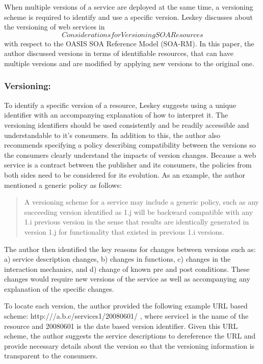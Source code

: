 \documentclass[runningheads,a4paper]{llncs}
\begin{document}
When multiple versions of a service are deployed at the same time, a versioning scheme is required to identify and use a specific version. Leskey discusses about the versioning of web services in \[Considerations for Versioning SOA Resources\] with respect to the OASIS SOA Reference Model (SOA-RM). In this paper, the author discussed versions in terms of identifiable resources, that can have multiple versions and are modified by applying new versions to the original one.

\subsubsection{Versioning:}
To identify a specific version of a resource, Leskey suggests using a unique identifier with an accompanying explanation of how to interpret it. The versioning identifiers should be used consistently and be readily accessible and understandable to it’s consumers. In addition to this, the author also recommends specifying a policy describing compatibility between the versions so the consumers clearly understand the impacts of version changes. Because a web service is a contract between the publisher and its consumers, the policies from both sides need to be considered for its evolution. As an example, the author mentioned a generic policy as follows:

\begin{quote}
  A versioning scheme for a service may include a generic policy, such as any succeeding version identified as 1.j will be backward compatible with any 1.i previous version in the sense that results are identically generated in version 1.j for functionality that existed in previous 1.i versions.
\end{quote}

The author then identified the key reasons for changes between versions such as: a) service description changes, b) changes in functions, c) changes in the interaction mechanics, and d) change of known pre and post conditions. These changes would require new versions of the service as well as accompanying any explanation of the specific changes.

To locate each version, the author provided the following example URL based scheme: http:///a.b.c/services1/20080601/ , where service1 is the name of the resource and 20080601 is the date based version identifier. Given this URL scheme, the author suggests the service descriptions to dereference the URL and provide necessary details about the version so that the versioning information is transparent to the consumers.
\end{document}
